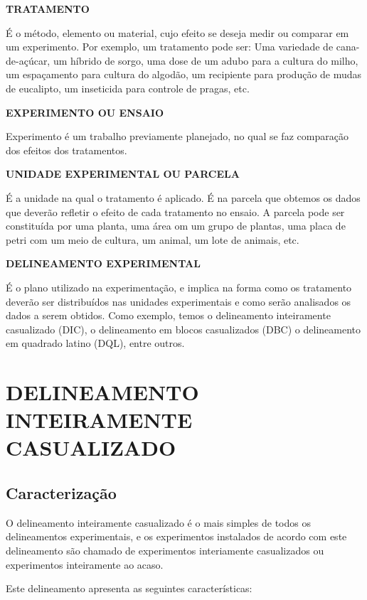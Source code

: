 \documentclass[
]{book}
\begin{document}
\textbf{TRATAMENTO}

É o método, elemento ou material, cujo efeito se deseja medir ou comparar em um experimento. Por exemplo, um tratamento pode ser: Uma variedade de cana-de-açúcar, um híbrido de sorgo, uma dose de um adubo para a cultura do milho, um espaçamento para cultura do algodão, um recipiente para produção de mudas de eucalipto, um inseticida para controle de pragas, etc.

\textbf{EXPERIMENTO OU ENSAIO}

Experimento é um trabalho previamente planejado, no qual se faz comparação dos efeitos dos tratamentos.

\textbf{UNIDADE EXPERIMENTAL OU PARCELA}

É a unidade na qual o tratamento é aplicado. É na parcela que obtemos os dados que deverão refletir o efeito de cada tratamento no ensaio. A parcela pode ser constituída por uma planta, uma área om um grupo de plantas, uma placa de petri com um meio de cultura, um animal, um lote de animais, etc.

\textbf{DELINEAMENTO EXPERIMENTAL}

É o plano utilizado na experimentação, e implica na forma como os tratamento deverão ser distribuídos nas unidades experimentais e como serão analisados os dados a serem obtidos. Como exemplo, temos o delineamento inteiramente casualizado (DIC), o delineamento em blocos casualizados (DBC) o delineamento em quadrado latino (DQL), entre outros.

\hypertarget{delineamento-inteiramente-casualizado}{%
\chapter{DELINEAMENTO INTEIRAMENTE CASUALIZADO}\label{delineamento-inteiramente-casualizado}}

\hypertarget{caracterizauxe7uxe3o}{%
\section{Caracterização}\label{caracterizauxe7uxe3o}}

O delineamento inteiramente casualizado é o mais simples de todos os delineamentos experimentais, e os experimentos instalados de acordo com este delineamento são chamado de experimentos interiamente casualizados ou experimentos inteiramente ao acaso.

Este delineamento apresenta as seguintes características:
\end{document}
